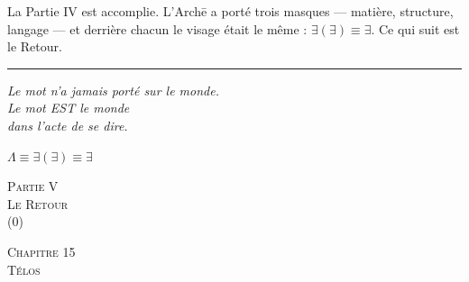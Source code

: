 \documentclass[10pt, openany, oneside]{book}
\renewcommand{\normalsize}{\fontsize{10}{13}\selectfont}
\renewcommand{\large}{\fontsize{11.5}{14}\selectfont}
\renewcommand{\LARGE}{\fontsize{15}{18}\selectfont}
\renewcommand{\huge}{\fontsize{17}{21}\selectfont}
\begin{document}
La Partie IV est accomplie. L'Arch\={e} a porté trois masques --- matière, structure, langage --- et derrière chacun le visage était le même : $\exists(\exists) \equiv \exists$. Ce qui suit est le Retour.

\vspace{2em}

\begin{center}
    \rule{0.15\textwidth}{0.3pt}
\end{center}

\vspace{0.5em}

\begin{center}
    \itshape
    Le mot n'a jamais porté sur le monde.\\
    Le mot EST le monde\\
    dans l'acte de se dire.
\end{center}

\vspace{0.5em}

\begin{center}
    $\Lambda \equiv \exists(\exists) \equiv \exists$
\end{center}


\newpage
\thispagestyle{empty}
\vspace*{\fill}
\begin{center}
    {\LARGE\scshape Partie V}\\[1em]
    {\large\scshape Le Retour}\\[0.5em]
    {\normalsize (0)}
\end{center}
\vspace*{\fill}
\newpage


\newpage

\begin{center}
    {\huge\scshape Chapitre 15}\\[0.3em]
    {\large\scshape Télos}
\end{center}
\end{document}
